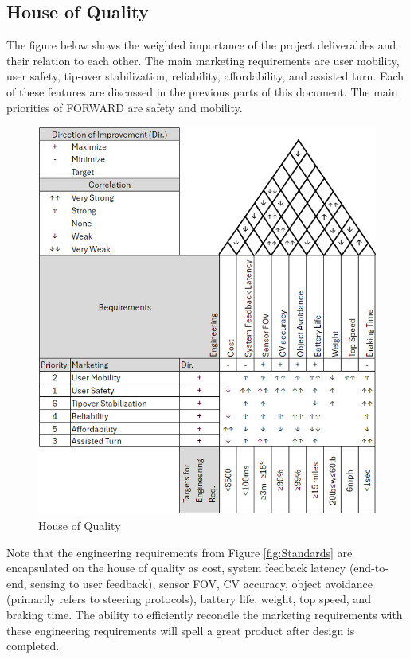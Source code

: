 \subsection{House of Quality}
\indent The figure below shows the weighted importance of the project deliverables and their relation to each other. The main marketing requirements are user mobility, user safety, tip-over stabilization, reliability, affordability, and assisted turn. Each of these features are discussed in the previous parts of this document. The main priorities of FORWARD are safety and mobility. 
\\

\begin{figure}[H]
	\centering
	\includegraphics[width=\textwidth]{./Images/HoQ.png}
	\caption{\label{fig:HoQ}House of Quality}
\end{figure}


\noindent
Note that the engineering requirements from Figure \ref{fig:Standards} are encapsulated on the house of quality as cost, system feedback latency (end-to-end, sensing to user feedback), sensor FOV, CV accuracy, object avoidance (primarily refers to steering protocols), battery life, weight, top speed, and braking time. The ability to efficiently reconcile the marketing requirements with these engineering requirements will spell a great product after design is completed. 
